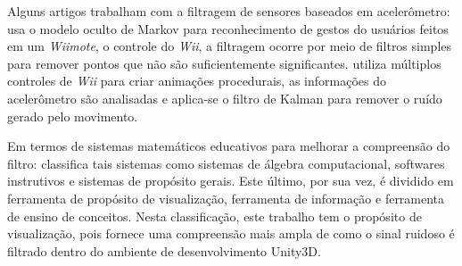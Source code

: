 \documentclass[conference]{IEEEtran}
\begin{document}
Alguns artigos trabalham com a filtragem de sensores baseados em acelerômetro: \cite{schlomer2008gesture} usa o modelo oculto de Markov para reconhecimento de gestos do usuários feitos em um \textit{Wiimote}, o controle do \textit{Wii}, a filtragem ocorre por meio de filtros simples para remover pontos que não são suficientemente significantes. \cite{shiratori2008accelerometer} utiliza múltiplos controles de \textit{Wii} para criar animações procedurais, as informações do acelerômetro são analisadas e aplica-se o filtro de Kalman para remover o ruído  gerado pelo movimento.

Em termos de sistemas matemáticos educativos para melhorar a compreensão do filtro: \cite{guyer2008computer} classifica tais sistemas como sistemas de álgebra computacional, softwares instrutivos e sistemas de propósito gerais. Este último, por sua vez, é dividido em ferramenta de propósito de visualização, ferramenta de informação e ferramenta de ensino de conceitos. Nesta classificação, este trabalho tem o propósito de visualização, pois fornece uma compreensão mais ampla de como o sinal ruidoso é filtrado dentro do ambiente de desenvolvimento Unity3D.

\end{document}
